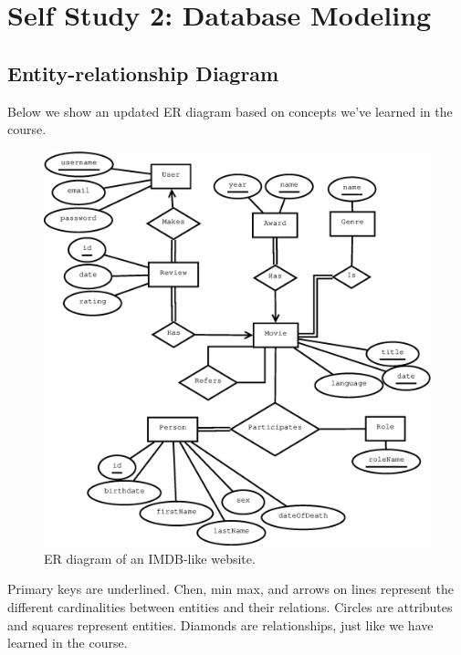 \section{Self Study 2: Database Modeling}

\subsection{Entity-relationship Diagram}
Below we show an updated ER diagram based on concepts we've learned in the course.
\begin{figure}[H]
  \centering
  \includegraphics[width=\linewidth]{2-17.02.14/ERDiagram.eps}
  \caption{ER diagram of an IMDB-like website.}\label{fig:ERdiagram2}
\end{figure}

Primary keys are underlined. Chen, min max, and arrows on lines represent the different cardinalities between entities and their relations. Circles are attributes and squares represent entities. Diamonds are relationships, just like we have learned in the course. 

